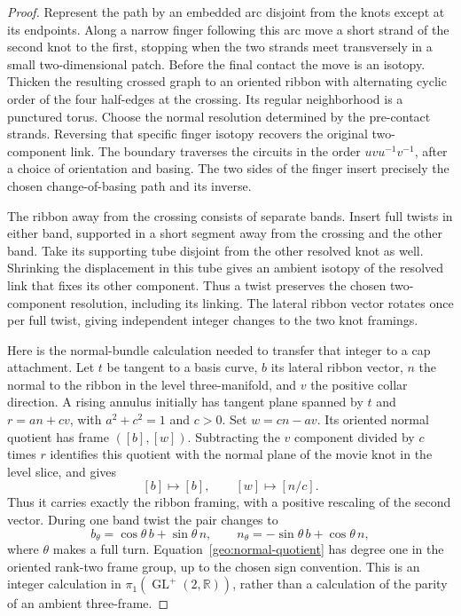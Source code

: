 \begin{proof}
Represent the path by an embedded arc disjoint from the knots except
at its endpoints.  Along a narrow finger following this arc move a
short strand of the second knot to the first, stopping when the two
strands meet transversely in a small two-dimensional patch.  Before
the final contact the move is an isotopy.  Thicken the resulting
crossed graph to an oriented ribbon with alternating cyclic order
of the four half-edges at the crossing.  Its regular neighborhood is
a punctured torus.  Choose the normal resolution determined by the
pre-contact strands.  Reversing that specific finger isotopy recovers
the original two-component link.  The boundary traverses the circuits
in the order
$uvu^{-1}v^{-1}$, after a choice of orientation and basing.  The two
sides of the finger insert precisely the chosen change-of-basing
path and its inverse.

The ribbon away from the crossing consists of separate bands.
Insert full twists in either band, supported in a short segment away
from the crossing and the other band.  Take its supporting tube disjoint
from the other resolved knot as well.  Shrinking the displacement in this tube gives
an ambient isotopy of the resolved link that fixes its other component.
Thus a twist preserves the chosen two-component resolution, including
its linking.  The lateral ribbon vector rotates once per full twist,
giving independent integer changes to the two knot framings.

Here is the normal-bundle calculation needed to transfer that integer
to a cap attachment.  Let $t$ be tangent to a basis curve, $b$ its
lateral ribbon vector, $n$ the normal to the ribbon in the level
three-manifold, and $v$ the positive collar direction.  A rising
annulus initially has tangent plane spanned by $t$ and
$r=a n+c v$, with $a^2+c^2=1$ and $c>0$.  Set $w=c n-a v$.
Its oriented normal quotient has frame $([b],[w])$.  Subtracting
the $v$ component divided by $c$ times $r$ identifies this quotient
with the normal plane of the movie knot in the level slice, and gives
\begin{equation}\label{geo:normal-quotient}
 [b]\longmapsto[b],\qquad [w]\longmapsto[n/c].
\end{equation}
Thus it carries exactly the ribbon framing, with a positive rescaling
of the second vector.  During one band twist the pair changes to
\[
 b_\theta=\cos\theta\,b+\sin\theta\,n,
 \qquad n_\theta=-\sin\theta\,b+\cos\theta\,n,
\]
where $\theta$ makes a full turn.  Equation~\eqref{geo:normal-quotient}
has degree one in the oriented rank-two frame group, up to the chosen
sign convention.  This is an integer calculation in
$\pi_1(\operatorname{GL}^+(2,\mathbb R))$, rather than a calculation
of the parity of an ambient three-frame.


\end{proof}
